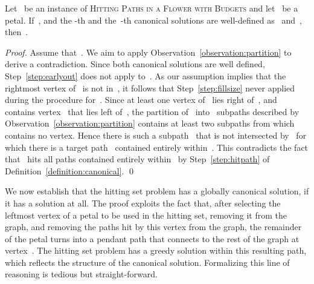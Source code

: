 \let\accentvec\vec  \documentclass{llncs}
\newcommand{\HitPathsInFlower}{\textsc{Hitting Paths in a Flower with Budgets}\xspace}
\begin{document}
\begin{lemma} \label{lemma:latersolutionsreachfurther}
Let~ be an instance of \HitPathsInFlower and let~ be a petal. If~, and the -th and the~-th canonical solutions are well-defined as~ and~, then~.
\end{lemma}
\begin{proof}
Assume that~. We aim to apply Observation~\ref{observation:partition} to derive a contradiction. Since both canonical solutions are well defined, Step~\ref{step:earlyout} does not apply to~. As our assumption implies that the rightmost vertex of~ is not in~, it follows that Step~\ref{step:fillsize} never applied during the procedure for~. Since at least one vertex of~ lies right of~, and~ contains vertex~ that lies left of~, the partition of~ into~ subpaths described by Observation~\ref{observation:partition} contains at least two subpaths from which~ contains no vertex. Hence there is such a subpath~ that is not intersected by~ for which there is a target path~ contained entirely within~. This contradicts the fact that~ hits all paths contained entirely within~ by Step~\ref{step:hitpath} of Definition~\ref{definition:canonical}.
\qed
\end{proof}

We now establish that the hitting set problem has a globally canonical solution, if it has a solution at all. The proof exploits the fact that, after selecting the leftmost vertex of a petal to be used in the hitting set, removing it from the graph, and removing the paths hit by this vertex from the graph, the remainder of the petal turns into a pendant path that connects to the rest of the graph at vertex~. The hitting set problem has a greedy solution within this resulting path, which reflects the structure of the canonical solution. Formalizing this line of reasoning is tedious but straight-forward.
\end{document}
